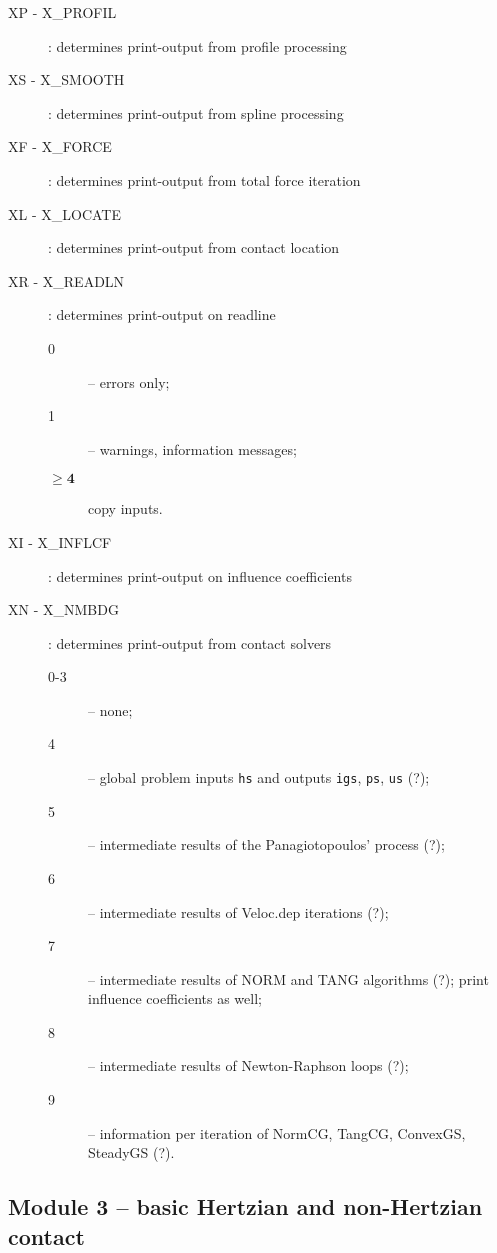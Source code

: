 \documentclass[12pt]{report}
\begin{document}
\begin{description}
\item[XP - X\_PROFIL] : determines print-output from profile processing

\item[XS - X\_SMOOTH] : determines print-output from spline processing

\item[XF - X\_FORCE] : determines print-output from total force iteration

\item[XL - X\_LOCATE] : determines print-output from contact location

\item[XR - X\_READLN] : determines print-output on readline
\begin{description}
\item[0] -- errors only;
\item[1] -- warnings, information messages;
\item[$\mathbf{\ge 4}$] copy inputs.
\end{description}

\item[XI - X\_INFLCF] : determines print-output on influence coefficients

\item[XN - X\_NMBDG] : determines print-output from contact solvers
\begin{description}
\item[0-3] -- none;
\item[4] -- global problem inputs {\tt hs} and outputs {\tt igs}, {\tt ps},
        {\tt us} (?);
\item[5] -- intermediate results of the Panagiotopoulos' process (?);
\item[6] -- intermediate results of Veloc.dep iterations (?);
\item[7] -- intermediate results of NORM and TANG algorithms (?); print influence coefficients as well;
\item[8] -- intermediate results of Newton-Raphson loops (?);
\item[9] -- information per iteration of NormCG, TangCG, ConvexGS, SteadyGS (?).
\end{description}

\end{description}

\subsection{Module 3 -- basic Hertzian and non-Hertzian contact}
\end{document}
